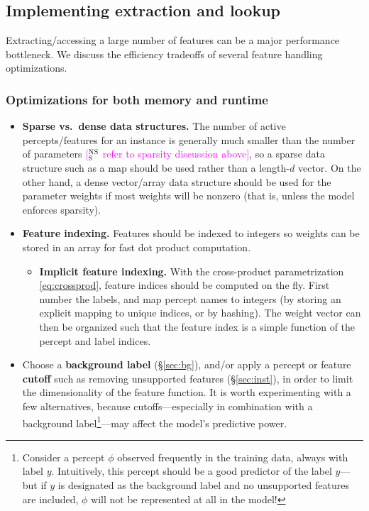 \documentclass[11pt,letterpaper]{article}
\newcommand{\ensuretext}[1]{#1}
\newcommand{\nssmarker}{\ensuretext{\textcolor{magenta}{\ensuremath{^{\textsc{NS}}_{\textsc{S}}}}}}
\newcommand{\arkcomment}[3]{\ensuretext{\textcolor{#3}{[#1 #2]}}}
\newcommand{\nss}[1]{\arkcomment{\nssmarker}{#1}{magenta}}
\newcommand{\Sref}[1]{\S\ref{#1}}
\newcommand{\eref}[1]{\eqref{#1}}
\begin{document}
\subsection{Implementing extraction and lookup}

Extracting/accessing a large number of features can be a major performance bottleneck. 
We discuss the efficiency tradeoffs of several feature handling optimizations.

\subsubsection{Optimizations for both memory and runtime}

\begin{itemize}
\item \textbf{Sparse vs.~dense data structures.} 
The number of active percepts\slash features for an instance 
is generally much smaller than the number of parameters \nss{refer to sparsity discussion above}, 
so a sparse data structure such as a map should be used rather than a length-$d$ vector.
On the other hand, a dense vector/array data structure should be used for the parameter weights
if most weights will be nonzero (that is, unless the model enforces sparsity).

\item \textbf{Feature indexing.}
Features should be indexed to integers so weights can be stored in an array for fast dot product computation.
\begin{itemize}
\item \textbf{Implicit feature indexing.} 
With the cross-product parametrization \eref{eq:crossprod}, 
feature indices should be computed on the fly.
First number the labels, 
and map percept names to integers (by storing an explicit mapping to unique indices, or by hashing).
The weight vector can then be organized such that the feature index 
is a simple function of the percept and label indices.
\end{itemize}

\item Choose a \textbf{background label} (\Sref{sec:bg}), 
and\slash or apply a percept or feature \textbf{cutoff} 
such as removing unsupported features (\Sref{sec:inst}), 
in order to limit the dimensionality of the feature function.
It is worth experimenting with a few alternatives, because cutoffs---especially 
in combination with a background label\footnote{Consider a percept $\phi$ observed frequently in the training
data, always with label $y$. Intuitively, this percept should be a good predictor of the label $y$---but
if $y$ is designated as the background label and no unsupported features are included,
$\phi$ will not be represented at all in the model!}---may affect the model's predictive power.
\end{itemize}
\end{document}
